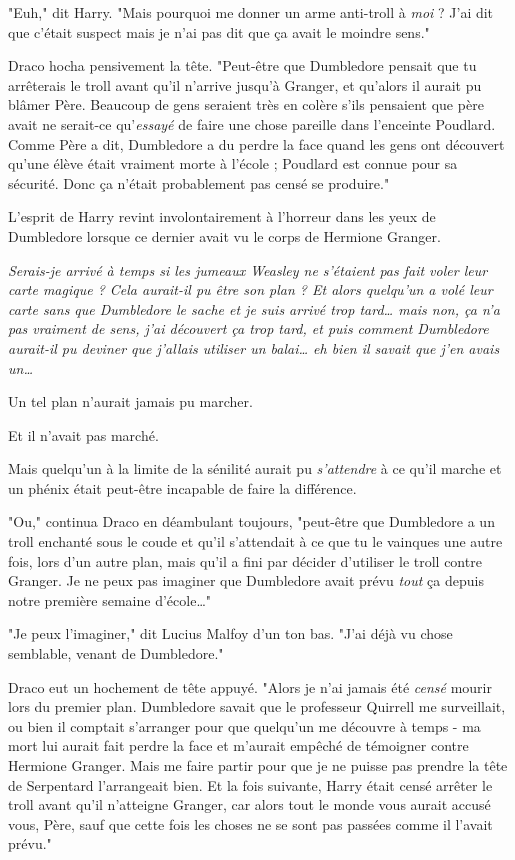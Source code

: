 "Euh," dit Harry. "Mais pourquoi me donner un arme anti-troll à \emph{moi}  ? J'ai dit que c'était suspect mais je n'ai pas dit que ça avait le moindre sens."

Draco hocha pensivement la tête. "Peut-être que Dumbledore pensait que tu arrêterais le troll avant qu'il n'arrive jusqu'à Granger, et qu'alors il aurait pu blâmer Père. Beaucoup de gens seraient très en colère s'ils pensaient que père avait ne serait-ce qu'\emph{essayé}  de faire une chose pareille dans l'enceinte Poudlard. Comme Père a dit, Dumbledore a du perdre la face quand les gens ont découvert qu'une élève était vraiment morte à l'école ; Poudlard est connue pour sa sécurité. Donc ça n'était probablement pas censé se produire."

L'esprit de Harry revint involontairement à l'horreur dans les yeux de Dumbledore lorsque ce dernier avait vu le corps de Hermione Granger.

\emph{Serais-je arrivé à temps si les jumeaux Weasley ne s'étaient pas fait voler leur carte magique ? Cela aurait-il pu être son plan ? Et alors quelqu'un a volé leur carte sans que Dumbledore le sache et je suis arrivé trop tard… mais non, ça n'a pas vraiment de sens, j'ai découvert ça trop tard, et puis comment Dumbledore aurait-il pu deviner que j'allais utiliser un balai… eh bien il savait que j'en avais un…} 

Un tel plan n'aurait jamais pu marcher.

Et il n'avait pas marché.

Mais quelqu'un à la limite de la sénilité aurait pu \emph{s'attendre}  à ce qu'il marche et un phénix était peut-être incapable de faire la différence.

"Ou," continua Draco en déambulant toujours, "peut-être que Dumbledore a un troll enchanté sous le coude et qu'il s'attendait à ce que tu le vainques une autre fois, lors d'un autre plan, mais qu'il a fini par décider d'utiliser le troll contre Granger. Je ne peux pas imaginer que Dumbledore avait prévu \emph{tout}  ça depuis notre première semaine d'école…"

"Je peux l'imaginer," dit Lucius Malfoy d'un ton bas. "J'ai déjà vu chose semblable, venant de Dumbledore."

Draco eut un hochement de tête appuyé. "Alors je n'ai jamais été \emph{censé}  mourir lors du premier plan. Dumbledore savait que le professeur Quirrell me surveillait, ou bien il comptait s'arranger pour que quelqu'un me découvre à temps - ma mort lui aurait fait perdre la face et m'aurait empêché de témoigner contre Hermione Granger. Mais me faire partir pour que je ne puisse pas prendre la tête de Serpentard l'arrangeait bien. Et la fois suivante, Harry était censé arrêter le troll avant qu'il n'atteigne Granger, car alors tout le monde vous aurait accusé vous, Père, sauf que cette fois les choses ne se sont pas passées comme il l'avait prévu."

